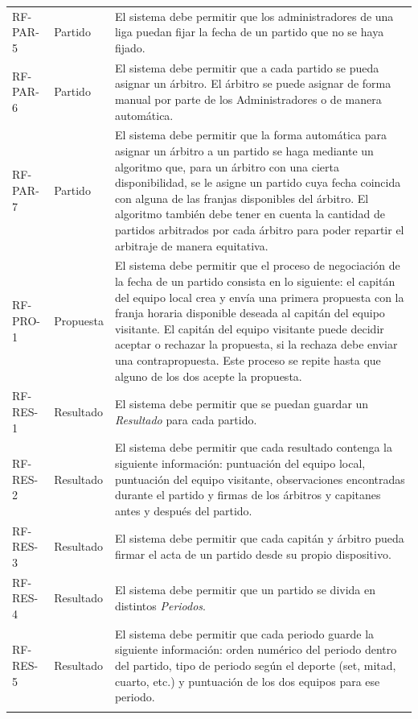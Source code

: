 {\begin{xltabular}{\textwidth}{>{\RaggedRight}p{1.7cm} p{1.8cm} >{\RaggedRight\arraybackslash}X}
        RF-PAR-5 & Partido & El sistema debe permitir que los administradores de una liga puedan fijar la fecha de un partido que no se haya fijado. \\ \lightrule
        RF-PAR-6 & Partido & El sistema debe permitir que a cada partido se pueda asignar un árbitro. El árbitro se puede asignar de forma manual por parte de los Administradores o de manera automática. \\ \lightrule
        RF-PAR-7 & Partido & El sistema debe permitir que la forma automática para asignar un árbitro a un partido se haga mediante un algoritmo que, para un árbitro con una cierta disponibilidad, se le asigne un partido cuya fecha coincida con alguna de las franjas disponibles del árbitro. El algoritmo también debe tener en cuenta la cantidad de partidos arbitrados por cada árbitro para poder repartir el arbitraje de manera equitativa. \\ \lightrule
        RF-PRO-1 & Propuesta & El sistema debe permitir que el proceso de negociación de la fecha de un partido consista en lo siguiente: el capitán del equipo local crea y envía una primera propuesta con la franja horaria disponible deseada al capitán del equipo visitante. El capitán del equipo visitante puede decidir aceptar o rechazar la propuesta, si la rechaza debe enviar una contrapropuesta. Este proceso se repite hasta que alguno de los dos acepte la propuesta. \\ \lightrule
        RF-RES-1 & Resultado & El sistema debe permitir que se puedan guardar un \emph{Resultado} para cada partido. \\ \lightrule
        RF-RES-2 & Resultado & El sistema debe permitir que cada resultado contenga la siguiente información: puntuación del equipo local, puntuación del equipo visitante, observaciones encontradas durante el partido y firmas de los árbitros y capitanes antes y después del partido. \\ \lightrule
        RF-RES-3 & Resultado & El sistema debe permitir que cada capitán y árbitro pueda firmar el acta de un partido desde su propio dispositivo. \\ \lightrule
        RF-RES-4 & Resultado & El sistema debe permitir que un partido se divida en distintos \emph{Periodos}. \\ \lightrule
        RF-RES-5 & Resultado & El sistema debe permitir que cada periodo guarde la siguiente información: orden numérico del periodo dentro del partido, tipo de periodo según el deporte (set, mitad, cuarto, etc.) y puntuación de los dos equipos para ese periodo. \\ \lightrule

\end{xltabular}}
